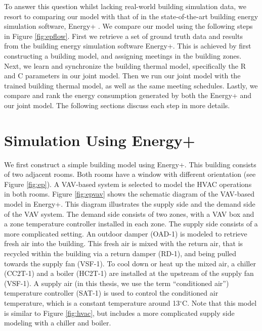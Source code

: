To answer this question whilst lacking real-world building simulation data, we resort to comparing our model with that of in the state-of-the-art building energy simulation software, Energy+ \citep{crawley2000energyplus}. We compare our model using the following steps in Figure \ref{fig:epflow}. First we retrieve a set of ground truth data and results from the building energy simulation software Energy+. This is achieved by first constructing a building model, and assigning meetings in the building zones. Next, we learn and synchronize the building thermal model, specifically the R and C parameters in our joint model. Then we run our joint model with the trained building thermal model, as well as the same meeting schedules. Lastly, we compare and rank the energy consumption generated by both the Energy+ and our joint model. The following sections discuss each step in more details.


\section{Simulation Using Energy+} \label{app:ep}

We first construct a simple building model using Energy+. This building consists of two adjacent rooms. Both rooms have a window with different orientation (see Figure \ref{fig:ep}). A VAV-based system is selected to model the HVAC operations in both rooms. Figure \ref{fig:epvav} shows the schematic diagram of the VAV-based model in Energy+. This diagram illustrates the supply side and the demand side of the VAV system. The demand side consists of two zones, with a VAV box and a zone temperature controller installed in each zone. The supply side consists of a more complicated setting. An outdoor damper (OAD-1) is modeled to retrieve fresh air into the building. This fresh air is mixed with the return air, that is recycled within the building via a return damper (RD-1), and being pulled towards the supply fan (VSF-1). To cool down or heat up the mixed air, a chiller (CC2T-1) and a boiler (HC2T-1) are installed at the upstream of the supply fan (VSF-1). A supply air (in this thesis, we use the term ``conditioned air'') temperature controller (SAT-1) is used to control the conditioned air temperature, which is a constant temperature around 13$^\circ$C. Note that this model is similar to Figure \ref{fig:hvac}, but includes a more complicated supply side modeling with a chiller and boiler. 

